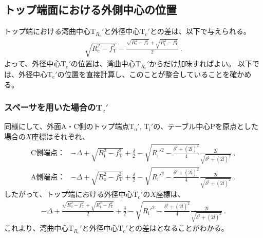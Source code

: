 \subsection{トップ端面における外側中心の位置}
トップ端における湾曲中心T$_{R_\mathrm c}'$と外径中心T$_\mathrm c'$との差は、以下で与えられる。
\begin{align}
  \label{eq:TRc-Tc}
  \sqrt{R_\mathrm c^2-f_\mathrm T^2}
  -\frac{\sqrt{R_\mathrm o^2-f_\mathrm T^2}+\sqrt{R_\mathrm i^2-f_\mathrm T^2}}2\ .
\end{align}
よって、外径中心T$_\mathrm c'$の位置は、湾曲中心T$_{R_\mathrm c}'$からだけ加味すればよい。
以下では、外径中心T$_\mathrm c'$の位置を直接計算し、このことが整合していることを確かめる。



\subsubsection{スペーサを用いた場合のT\texorpdfstring{$_\mathrm c'$}{c'}}
同様にして、外面A・C側のトップ端点T$_\mathrm o'$, T$_\mathrm i'$の、テーブル中心Pを原点とした場合の$X$座標はそれぞれ、
\begin{align*}
  \text{C側端点：}&
  -\varDelta+\sqrt{R_\mathrm i^2-f_\mathrm T^2}+\frac\delta2
  -\sqrt{R_\mathrm i'^2-\frac{\delta^2+(2\bar l)^2}4}\frac{2\bar l}{\sqrt{\delta^2+(2\bar l)^2}}\ ,\\
  \text{A側端点：}&
  -\varDelta+\sqrt{R_\mathrm o^2-f_\mathrm T^2}+\frac\delta2
  -\sqrt{R_\mathrm i'^2-\frac{\delta^2+(2\bar l)^2}4}\frac{2\bar l}{\sqrt{\delta^2+(2\bar l)^2}}\ .
\end{align*}
したがって、トップ端における外径中心T$_\mathrm c'$の$X$座標は、
\begin{align}
  \label{eq:spacerTc}
  -\varDelta+\frac{\sqrt{R_\mathrm o^2-f_\mathrm T^2}+\sqrt{R_\mathrm i^2-f_\mathrm T^2}}2
  +\frac\delta2-\sqrt{R_\mathrm i'^2-\frac{\delta^2+(2\bar l)^2}4}\frac{2\bar l}{\sqrt{\delta^2+(2\bar l)^2}}\ .
\end{align}
これより、湾曲中心T$_{R_\mathrm c}'$と外径中心T$_\mathrm c'$との差はとなることがわかる。


